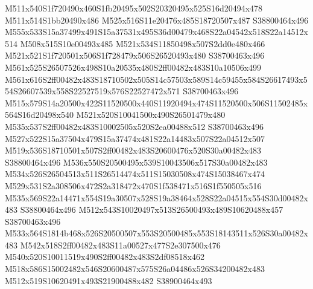 \documentclass{article}
\begin{document}
\begin{multicols}{2}








M511x540S1f720490x460S1fb20495x502S20320495x525S16d20494x478 M511x514S1bb20490x486 M525x516S11e20476x485S18720507x487 S38800464x496 M555x533S15a37499x491S15a37531x495S36d00479x468S22a04542x518S22a14512x514 M508x515S10e00493x485 M521x534S11850498x507S2dd0e480x466 M521x521S1f720501x506S1f728479x506S26520493x480 S38700463x496 M561x525S26507526x498S10a20535x480S2ff00482x483S10a10506x499 M561x616S2ff00482x483S18710502x505S14c57503x589S14c59455x584S26617493x554S26607539x558S22527519x576S22527472x571 S38700463x496 M515x579S14a20500x422S11520500x440S11920494x474S11520500x506S11502485x564S16d20498x540 M521x520S10041500x490S26501479x480 M535x537S2ff00482x483S10002505x520S2ea00488x512 S38700463x496 M527x522S15a37504x479S15a37474x481S22a14483x507S22a04512x507 M519x536S18710501x507S2ff00482x483S20600476x520S30a00482x483 S38800464x496 M536x550S20500495x539S10043506x517S30a00482x483 M534x526S26504513x511S26514474x511S15030508x474S15038467x474 M529x531S2a308506x472S2a318472x470S1f538471x516S1f550505x516 M535x569S22a14471x554S19a30507x528S19a38464x528S22a04515x554S30d00482x483 S38800464x496 M512x543S10020497x513S26500493x489S10620488x457 S38700463x496 M533x564S1814b468x526S20500507x553S20500485x553S18143511x526S30a00482x483 M542x518S2ff00482x483S11a00527x477S2e307500x476 M540x520S10011519x490S2ff00482x483S2df08518x462 M518x586S15002482x546S20600487x575S26a04486x526S34200482x483 M512x519S10620491x493S21900488x482 S38900464x493


\end{multicols}
\end{document}
